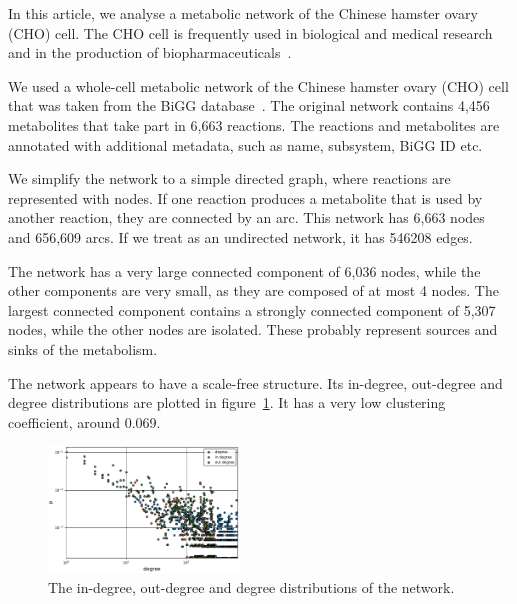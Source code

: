 In this article, we analyse a metabolic network of the Chinese hamster
ovary (CHO) cell. The CHO cell is frequently used in biological and medical
research and in the production of biopharmaceuticals~\cite{chocons}.

We used a whole-cell metabolic network of the Chinese hamster ovary (CHO)
cell that was taken from the BiGG database~\cite{bigg,chocons}. The original
network contains 4,456 metabolites that take part in 6,663 reactions. The
reactions and metabolites are annotated with additional metadata, such as name,
subsystem, BiGG ID etc.

We simplify the network to a simple directed graph, where reactions are
represented with nodes. If one reaction produces a metabolite that is used by
another reaction, they are connected by an arc. This network has 6,663 nodes and
656,609 arcs. If we treat as an undirected network, it has 546208 edges.

The network has a very large connected component of 6,036 nodes, while the other
components are very small, as they are composed of at most 4 nodes. The largest
connected component contains a strongly connected component of 5,307 nodes,
while the other nodes are isolated. These probably represent sources and sinks
of the metabolism.

The network appears to have a scale-free structure. Its in-degree, out-degree and degree
distributions are plotted in figure~\ref{fig:dist}. It has a very low clustering
coefficient, around 0.069.

\begin{figure}
  \includegraphics[width=0.45\textwidth]{../plots/degree}
  \caption{The in-degree, out-degree and degree distributions of the network.}
  \label{fig:dist}
\end{figure}

